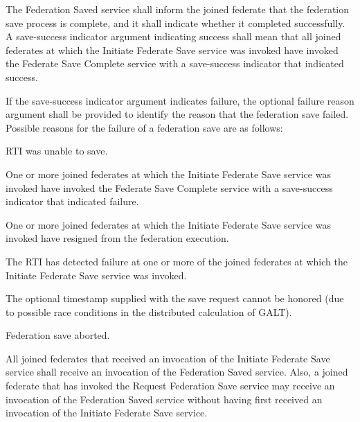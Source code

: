 The Federation Saved \rtiinitiated{} service shall inform the joined federate that the federation save process is complete, and it shall indicate whether it completed successfully. A save-success indicator argument indicating success shall mean that all joined federates at which the Initiate Federate Save \rtiinitiated{} service was invoked have invoked the Federate Save Complete service with a save-success indicator that indicated success.

If the save-success indicator argument indicates failure, the optional failure reason argument shall be provided to identify the reason that the federation save failed. Possible reasons for the failure of a federation save are as follows:

\begin{stddashlist}
    \item RTI was unable to save.
    \item One or more joined federates at which the Initiate Federate Save \rtiinitiated{} service was invoked have invoked the Federate Save Complete service with a save-success indicator that indicated failure.
\end{stddashlist}

\clearpage

\begin{stddashlist}
    \item One or more joined federates at which the Initiate Federate Save \rtiinitiated{} service was invoked have resigned from the federation execution.
    \item The RTI has detected failure at one or more of the joined federates at which the Initiate Federate Save \rtiinitiated{} service was invoked.
    \item The optional timestamp supplied with the save request cannot be honored (due to possible race conditions in the distributed calculation of GALT).
    \item Federation save aborted.
\end{stddashlist}

All joined federates that received an invocation of the Initiate Federate Save \rtiinitiated{} service shall receive an invocation of the Federation Saved \rtiinitiated{} service. Also, a joined federate that has invoked the Request Federation Save service may receive an invocation of the Federation Saved \rtiinitiated{} service without having first received an invocation of the Initiate Federate Save \rtiinitiated{} service.

